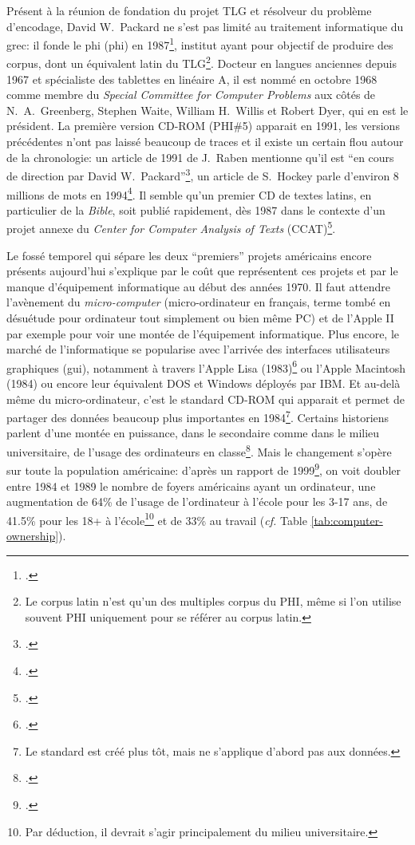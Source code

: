 Présent à la réunion de fondation du projet TLG et résolveur du problème d'encodage, David W.~Packard ne s'est pas limité au traitement informatique du grec: il fonde le \acrfull{phi} (\acrshort{phi}) en 1987\footcite{helgerson_cd-rom_1988}, institut ayant pour objectif de produire des corpus, dont un équivalent latin du TLG\footnote{Le corpus latin n'est qu'un des multiples corpus du PHI, même si l'on utilise souvent PHI uniquement pour se référer au corpus latin.}. Docteur en langues anciennes depuis 1967 et spécialiste des tablettes en linéaire A, il est nommé en octobre 1968 comme membre du \textit{Special Committee for Computer Problems} aux côtés de N.~A.~Greenberg, Stephen Waite, William H.~Willis et Robert Dyer, qui en est le président. La première version CD-ROM (PHI\#5) apparait en 1991, les versions précédentes n'ont pas laissé beaucoup de traces et il existe un certain flou autour de la chronologie: un article de 1991 de J.~Raben mentionne qu'il est \enquote{en cours de direction par David W.~Packard}\footcite{raben_humanities_1991}, un article de S.~Hockey parle d'environ 8 millions de mots en 1994\footcite{hockey_electronic_1994}. Il semble qu'un premier CD de textes latins, en particulier de la \textit{Bible}, soit publié rapidement, dès 1987 dans le contexte d'un projet annexe du \textit{Center for Computer Analysis of Texts} (CCAT)\footcite{groves_tovs_1990, cornell_greek_1989}.

Le fossé temporel qui sépare les deux \enquote{premiers} projets américains encore présents aujourd'hui s'explique par le coût que représentent ces projets et par le manque d'équipement informatique au début des années 1970. Il faut attendre l'avènement du \textit{micro-computer} (micro-ordinateur en français, terme tombé en désuétude pour ordinateur tout simplement ou bien même PC) et de l'Apple II par exemple pour voir une montée de l'équipement informatique. Plus encore, le marché de l'informatique se popularise avec l'arrivée des interfaces utilisateurs graphiques (\acrshort{gui}), notamment à travers l'Apple Lisa (1983)\footcite{noauthor_history_2021} ou l'Apple Macintosh (1984) ou encore leur équivalent DOS et Windows déployés par IBM. Et au-delà même du micro-ordinateur, c'est le standard CD-ROM qui apparait et permet de partager des données beaucoup plus importantes en 1984\footnote{Le standard est créé plus tôt, mais ne s'applique d'abord pas aux données.}. Certains historiens parlent d'une montée en puissance, dans le secondaire comme dans le milieu universitaire, de l'usage des ordinateurs en classe\footcite{simkin_introduction_1989, latousek_fifty_2001}. Mais le changement s'opère sur toute la population américaine: d'après un rapport de 1999\footcite{kominski1999access}, on voit doubler  entre 1984 et 1989 le nombre de foyers américains ayant un ordinateur, une augmentation de 64\% de l'usage de l'ordinateur à l'école pour les 3-17 ans, de 41.5\% pour les 18+ à l'école\footnote{Par déduction, il devrait s'agir principalement du milieu universitaire.} et de 33\% au travail (\textit{cf.} Table \ref{tab:computer-ownership}).

